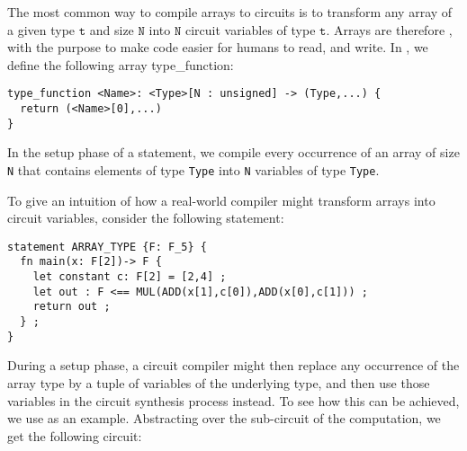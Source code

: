 The most common way to compile arrays to circuits is to transform any array of a given type $\texttt{t}$ and size $\texttt{N}$ into $\texttt{N}$ circuit variables of type $\texttt{t}$. Arrays are therefore , with the purpose to make code easier for humans to read, and write. In , we define the following array type\_function:
\begin{lstlisting}
type_function <Name>: <Type>[N : unsigned] -> (Type,...) { 
  return (<Name>[0],...)
}
\end{lstlisting}
In the setup phase of a statement, we compile every occurrence of an array of size \texttt{N} that contains elements of type \texttt{Type} into \texttt{N} variables of type \texttt{Type}.
\begin{example} To give an intuition of how a real-world compiler might transform arrays into circuit variables, consider the following  statement:
\begin{lstlisting}
statement ARRAY_TYPE {F: F_5} {
  fn main(x: F[2])-> F {
  	let constant c: F[2] = [2,4] ;
  	let out : F <== MUL(ADD(x[1],c[0]),ADD(x[0],c[1])) ;
  	return out ;
  } ;
}
\end{lstlisting}
During a setup phase, a circuit compiler might then replace any occurrence of the array type by a tuple of variables of the underlying type, and then use those variables in the circuit synthesis process instead. To see how this can be achieved, we use  as an example. Abstracting over the sub-circuit of the computation, we get the following circuit:
\begin{center}
\end{center}
\end{example}
